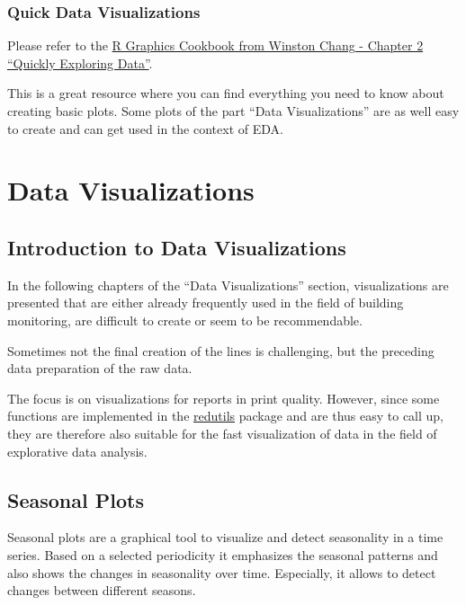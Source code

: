 \documentclass[
  a4paperpaper,
]{book}
\begin{document}
\hypertarget{quick-data-visualizations}{%
\section{Quick Data Visualizations}\label{quick-data-visualizations}}

Please refer to the \href{https://r-graphics.org/chapter-quick}{R Graphics Cookbook from Winston Chang - Chapter 2 ``Quickly Exploring Data''}.

This is a great resource where you can find everything you need to know about creating basic plots.
Some plots of the part ``Data Visualizations'' are as well easy to create and can get used in the context of EDA.

\hypertarget{part-data-visualizations}{%
\part{Data Visualizations}\label{part-data-visualizations}}

\hypertarget{introduction-to-data-visualizations}{%
\chapter{Introduction to Data Visualizations}\label{introduction-to-data-visualizations}}

In the following chapters of the ``Data Visualizations'' section, visualizations are presented that are either already frequently used in the field of building monitoring, are difficult to create or seem to be recommendable.

Sometimes not the final creation of the lines is challenging, but the preceding data preparation of the raw data.

The focus is on visualizations for reports in print quality. However, since some functions are implemented in the \href{https://github.com/hslu-ige-laes/redutils}{redutils} package and are thus easy to call up, they are therefore also suitable for the fast visualization of data in the field of explorative data analysis.

\hypertarget{seasonal-plots}{%
\chapter{Seasonal Plots}\label{seasonal-plots}}

Seasonal plots are a graphical tool to visualize and detect seasonality in a time series. Based on a selected periodicity it emphasizes the seasonal patterns and also shows the changes in seasonality over time. Especially, it allows to detect changes between different seasons.
\end{document}
